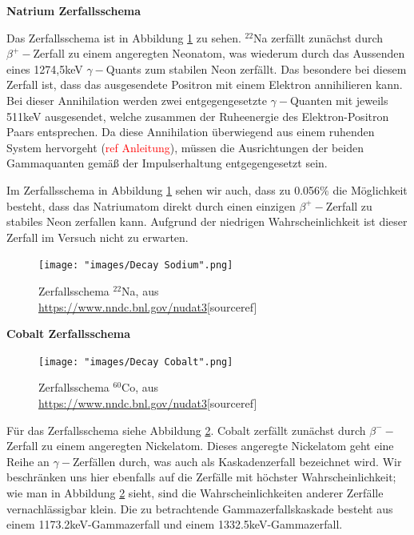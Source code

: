 \documentclass[%
aps,
onecolumn,
11pt,
tightenlines,
nofootinbib,
superscriptaddress,
floatfix,
prd,
]{revtex4-2}
\begin{document}
\textbf{Natrium Zerfallsschema} \par
Das Zerfallsschema ist in Abbildung \ref{fig:decaysodium} zu sehen. $^{22}$Na zerfällt zunächst durch $\beta^+ -$Zerfall zu einem angeregten Neonatom, was wiederum durch das Aussenden eines 1274,5keV $\gamma-$Quants zum stabilen Neon zerfällt. Das besondere bei diesem Zerfall ist, dass das ausgesendete Positron mit einem Elektron annihilieren kann. Bei dieser Annihilation werden zwei entgegengesetzte $\gamma-$Quanten mit jeweils 511keV ausgesendet, welche zusammen der Ruheenergie des Elektron-Positron Paars entsprechen. Da diese Annihilation überwiegend aus einem ruhenden System hervorgeht \cite{manual1}(\textcolor{red}{ref Anleitung}), müssen die Ausrichtungen der beiden Gammaquanten gemäß der Impulserhaltung entgegengesetzt sein. \par
Im Zerfallsschema in Abbildung \ref{fig:decaysodium} sehen wir auch, dass zu 0.056$\%$ die Möglichkeit besteht, dass das Natriumatom direkt durch einen einzigen $\beta^+ -$Zerfall zu stabiles Neon zerfallen kann. Aufgrund der niedrigen Wahrscheinlichkeit ist dieser Zerfall im Versuch nicht zu erwarten.
\begin{figure}[ht]
	\texttt{[image: "images/Decay Sodium".png]}
	\caption{Zerfallsschema $^{22}$Na, aus \url{https://www.nndc.bnl.gov/nudat3}[sourceref]}
	\label{fig:decaysodium}
\end{figure}

\noindent \textbf{Cobalt Zerfallsschema}\\
\begin{figure}[ht]
	\texttt{[image: "images/Decay Cobalt".png]}
	\caption{Zerfallsschema $^{60}$Co, aus \url{https://www.nndc.bnl.gov/nudat3}[sourceref]}
	\label{fig:decaycobalt}
\end{figure}
Für das Zerfallsschema siehe Abbildung \ref{fig:decaycobalt}. Cobalt zerfällt zunächst durch $\beta^- -$Zerfall zu einem angeregten Nickelatom. Dieses angeregte Nickelatom geht eine Reihe an $\gamma -$Zerfällen durch, was auch als Kaskadenzerfall bezeichnet wird. Wir beschränken uns hier ebenfalls auf die Zerfälle mit höchster Wahrscheinlichkeit; wie man in Abbildung \ref{fig:decaycobalt} sieht, sind die Wahrscheinlichkeiten anderer Zerfälle vernachlässigbar klein. Die zu betrachtende Gammazerfallskaskade besteht aus einem 1173.2keV-Gammazerfall und einem 1332.5keV-Gammazerfall. 
\end{document}

